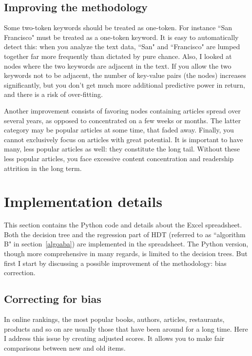\documentclass[oneside,10pt]{book}
\begin{document}
\subsection{Improving the methodology}\label{ccvcx}

Some two-token keywords should be treated as one-token. For instance ``San Francisco" must be treated as a one-token keyword. It is easy to automatically detect this: when you analyze the text data, ``San" and ``Francisco" are lumped together far more frequently than dictated by pure chance. 
Also, I looked at nodes  where the two keywords are adjacent in the text. If you allow the two keywords not to be adjacent, the number of key-value pairs (the nodes) increases significantly, but you don't get much more additional predictive power in return, and there is a risk of over-fitting. 


Another improvement consists of favoring nodes containing articles spread over several years, as opposed to concentrated on a few weeks or months. The latter category may be popular articles at some time, that faded away.
Finally, you cannot exclusively focus on articles with great potential. It is important to have many, less popular articles as well: they constitute the long tail. Without these less popular articles, you face excessive content concentration and readership attrition in the long term. 

\section{Implementation details}

This section contains the Python code and details about the Excel spreadsheet. Both the decision tree and the regression part of HDT (referred to as ``algorithm B" in section~\ref{algoaba}) are implemented in the spreadsheet. The Python version, though more comprehensive in many regards, is limited to the decision trees. But first
I start by discussing a possible improvement of the methodology: bias correction.

\subsection{Correcting for bias}\label{timeab}

In online rankings, the most popular books, authors, articles, restaurants, products and so on are usually those that have been around for a long time. 
Here I address this issue by creating adjusted scores. It allows you to make fair comparisons between new and old items.
\end{document}
